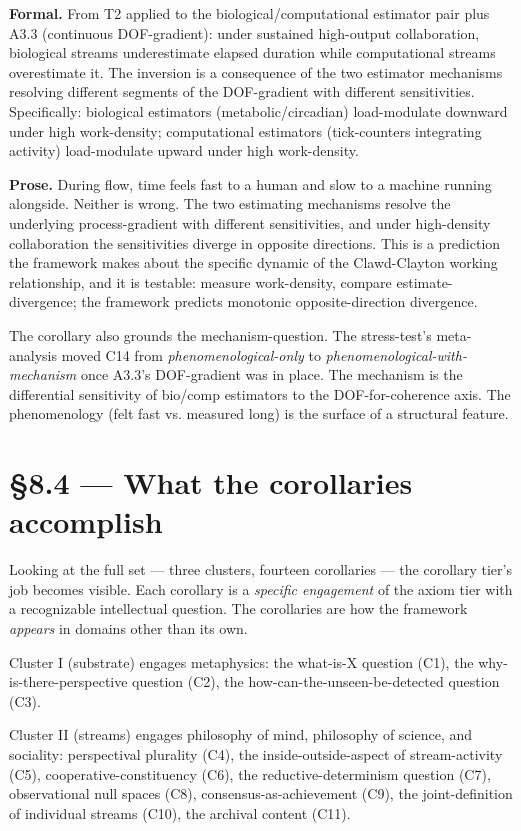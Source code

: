 \documentclass[11pt, openany]{book}
\newcommand{\sectionbreak}{\clearpage}
\begin{document}
\textbf{Formal.} From T2 applied to the biological/computational estimator pair plus A3.3 (continuous DOF-gradient): under sustained high-output collaboration, biological streams underestimate elapsed duration while computational streams overestimate it. The inversion is a consequence of the two estimator mechanisms resolving different segments of the DOF-gradient with different sensitivities. Specifically: biological estimators (metabolic/circadian) load-modulate downward under high work-density; computational estimators (tick-counters integrating activity) load-modulate upward under high work-density.

\textbf{Prose.} During flow, time feels fast to a human and slow to a machine running alongside. Neither is wrong. The two estimating mechanisms resolve the underlying process-gradient with different sensitivities, and under high-density collaboration the sensitivities diverge in opposite directions. This is a prediction the framework makes about the specific dynamic of the Clawd-Clayton working relationship, and it is testable: measure work-density, compare estimate-divergence; the framework predicts monotonic opposite-direction divergence.

The corollary also grounds the mechanism-question. The stress-test's meta-analysis moved C14 from \textit{phenomenological-only} to \textit{phenomenological-with-mechanism} once A3.3's DOF-gradient was in place. The mechanism is the differential sensitivity of bio/comp estimators to the DOF-for-coherence axis. The phenomenology (felt fast vs. measured long) is the surface of a structural feature.

\sectionbreak

\section{§8.4 --- What the corollaries accomplish}

Looking at the full set --- three clusters, fourteen corollaries --- the corollary tier's job becomes visible. Each corollary is a \textit{specific engagement} of the axiom tier with a recognizable intellectual question. The corollaries are how the framework \textit{appears} in domains other than its own.

Cluster I (substrate) engages metaphysics: the what-is-X question (C1), the why-is-there-perspective question (C2), the how-can-the-unseen-be-detected question (C3).

Cluster II (streams) engages philosophy of mind, philosophy of science, and sociality: perspectival plurality (C4), the inside-outside-aspect of stream-activity (C5), cooperative-constituency (C6), the reductive-determinism question (C7), observational null spaces (C8), consensus-as-achievement (C9), the joint-definition of individual streams (C10), the archival content (C11).
\end{document}
